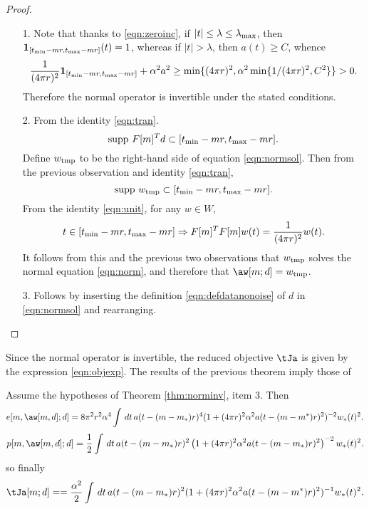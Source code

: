 \begin{proof}
  \begin{itemize}
  \item[1. ]Note that thanks to \ref{eqn:zeroinc}, if $|t|\le
    \lambda \le \lambda_{\rm max}$, then ${\bf 1}_{[t_{\rm min}-mr,  
      t_{\rm max}-mr]}(t) = 1$, whereas if $|t|>\lambda$,
    then $a(t) \ge C$, whence
    \[
      \frac{1}{(4\pi r)^2}  {\bf 1}_{[t_{\rm min}-mr,  
        t_{\rm max}-mr]} + \alpha^2a^2  \ge \min\{(4\pi r)^2,
      \alpha^2\min\{1/(4\pi r)^2,C^2\} \}> 0.
    \]
    Therefore the normal operator is invertible under the stated
    conditions.

  \item[2. ]From the identity \ref{eqn:tran}.
    \[
      \mbox{supp }F[m]^Td \subset [t_{\rm min}-mr,t_{\rm max}-mr].
    \]
    Define $w_{\rm tmp}$ to be the right-hand side of equation \ref{eqn:normsol}. Then
    from the previous observation and identity \ref{eqn:tran},
    \[
      \mbox{supp }w_{\rm tmp} \subset [t_{\rm min}-mr,t_{\rm max}-mr].
    \]
    From the identity \ref{eqn:unit}, for any $w \in W$,
    \[
      t \in [t_{\rm min}-mr,t_{\rm max}-mr] \Rightarrow F[m]^TF[m]w(t)
      = \frac{1}{(4 \pi r)^2}w(t).
    \]
    It follows from this and the previous two observations that
    $w_{\rm tmp}$ solves the normal equation \ref{eqn:norm}, and
    therefore that $\aw[m;d]=w_{\rm tmp}$.

  \item[3. ]Follows by inserting the definition
    \ref{eqn:defdatanonoise} of $d$ in \ref{eqn:normsol} and
    rearranging.
  \end{itemize}
\end{proof}

Since the normal operator is invertible, the reduced
objective $\tJa$ is given by the expression \ref{eqn:objexp}.
The results of the previous theorem imply those of

\begin{theorem}
  \label{thm:epjnonoise}
  Assume the hypotheses of Theorem \ref{thm:norminv}, item 3. Then 
\begin{equation}
  \label{eqn:residnorm}
  e[m,\aw[m,d];d] 
= 8 \pi^2 r^2 \alpha^4\int\,dt\,a(t-(m-m_*)r)^4(1+(4\pi r)^2 \alpha^2 
    a(t-(m-m^*)r)^2)^{-2}w_*(t)^2.
\end{equation}
\begin{equation}
  \label{eqn:anninorm}
  p[m,\aw[m,d];d] = \frac{1}{2}\int \,dt\,  a(t-(m-m_*)r)^2 \left(1+ (4\pi r)^2\alpha^2
    a(t-(m-m_*)r)^2\right)^{-2}w_*(t)^2.
\end{equation}
so finally
\begin{equation}
\label{eqn:expjgen}
\tJa[m;d] = =\frac{\alpha^2}{2}\int\,dt\,a(t-(m-m_*)r)^2(1+(4\pi r)^2 \alpha^2 
  a(t-(m-m^*)r)^2)^{-1}w_*(t)^2.
\end{equation}
\end{theorem}

